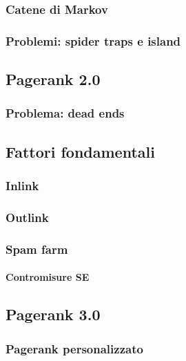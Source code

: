 			\subsubsection{Catene di Markov}
			
			\subsubsection{Problemi: spider traps e island}
				
		\subsection{Pagerank 2.0}
		
			\subsubsection{Problema: dead ends}
		
		\subsection{Fattori fondamentali}
		
			\subsubsection{Inlink}
			
			\subsubsection{Outlink}
			
			\subsubsection{Spam farm}
				
				\paragraph{Contromisure SE}
			
		\subsection{Pagerank 3.0}
		
			\subsubsection{Pagerank personalizzato}
			

